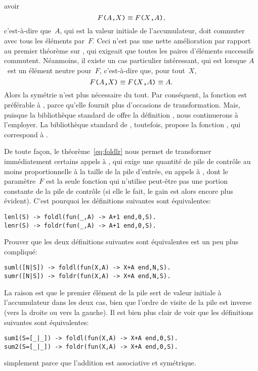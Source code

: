 avoir
\begin{equation*}
\texttt{\(F\)(\(A\),\(X\))}
\equiv
\texttt{\(F\)(\(X\),\(A\))},
\end{equation*}
c'est-à-dire que~\(A\), qui est la valeur initiale de l'accumulateur,
doit commuter avec tous les éléments par~\(F\). Ceci n'est pas une
nette amélioration par rapport au premier théorème sur
, qui exigeait que toutes les paires d'éléments
successifs commutent. Néanmoins, il existe un cas particulier
intéressant, qui est lorsque \(A\)~est un élément neutre pour~\(F\),
c'est-à-dire que, pour tout~\(X\),
\begin{equation*}
\texttt{\(F\)(\(A\),\(X\))}
\equiv
\texttt{\(F\)(\(X\),\(A\))} \equiv A.
\end{equation*}
Alors la symétrie n'est plus nécessaire du tout. Par conséquent, la
fonction  est préférable à ,
parce qu'elle fournit plus d'occasions de transformation. Mais,
puisque la bibliothèque standard de \Erlang offre la définition
, nous continuerons à l'employer. La bibliothèque
standard de \OCaml, toutefois, propose la fonction
, qui correspond à .

De toute façon, le théorème~\eqref{eq:foldlr} nous permet de
transformer immédiatement certains appels à , qui
exige une quantité de pile de contrôle au moins proportionnelle à la
taille de la pile d'entrée, en appels à , dont le
paramètre~\(F\) est la seule fonction qui n'utilise peut-être pas une
portion constante de la pile de contrôle (si elle le fait, le gain est
alors encore plus évident). C'est pourquoi les définitions suivantes
sont équivalentes:
\begin{verbatim}
lenl(S) -> foldl(fun(_,A) -> A+1 end,0,S).
lenr(S) -> foldr(fun(_,A) -> A+1 end,0,S).
\end{verbatim}
Prouver que les deux définitions suivantes sont équivalentes est un
peu plus compliqué:
\begin{verbatim}
suml([N|S]) -> foldl(fun(X,A) -> X+A end,N,S).
sumr([N|S]) -> foldr(fun(X,A) -> X+A end,N,S).
\end{verbatim}
La raison est que le premier élément de la pile sert de valeur
initiale à l'accumulateur dans les deux cas, bien que l'ordre de
visite de la pile est inverse (vers la droite ou vers la gauche). Il
est bien plus clair de voir que les définitions suivantes sont
équivalentes:
\begin{verbatim}
sum1(S=[_|_]) -> foldl(fun(X,A) -> X+A end,0,S).
sum2(S=[_|_]) -> foldr(fun(X,A) -> X+A end,0,S).
\end{verbatim}
simplement parce que l'addition est associative et symétrique.

